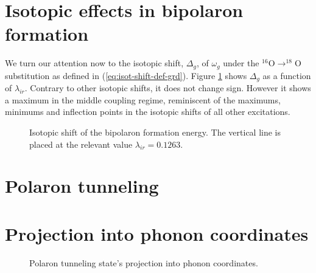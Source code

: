 \section{Isotopic effects in bipolaron formation}
\label{sec:grd-isotopic}

We turn our attention now to the isotopic shift, $\Delta_g$, of $\omega_g$ under the $^{16}$O$\rightarrow ^{18}$O substitution as defined in (\ref{eq:isot-shift-def-grd}).
Figure \ref{fig:isotPolaronFormation} shows $\Delta_g$ as a function of $\lambda_{ir}$.
Contrary to other isotopic shifts, it does not change sign.
However it shows a maximum in the middle coupling regime, reminiscent of the maximums, minimums and inflection points in the isotopic shifts of all other excitations.

\begin{figure}[ht!]
  \centering
  
  \caption{Isotopic shift of the bipolaron formation energy. The vertical line is placed at the relevant value $\lambda_{ir}=0.1263$.}
  \label{fig:isotPolaronFormation}
\end{figure}


\section{Polaron tunneling}



\section{Projection into phonon coordinates}

\begin{figure}[ht!]
  \centering
  
  \caption{Polaron tunneling state's projection into phonon coordinates.}
  \label{fig:phononProjPol}
\end{figure}


